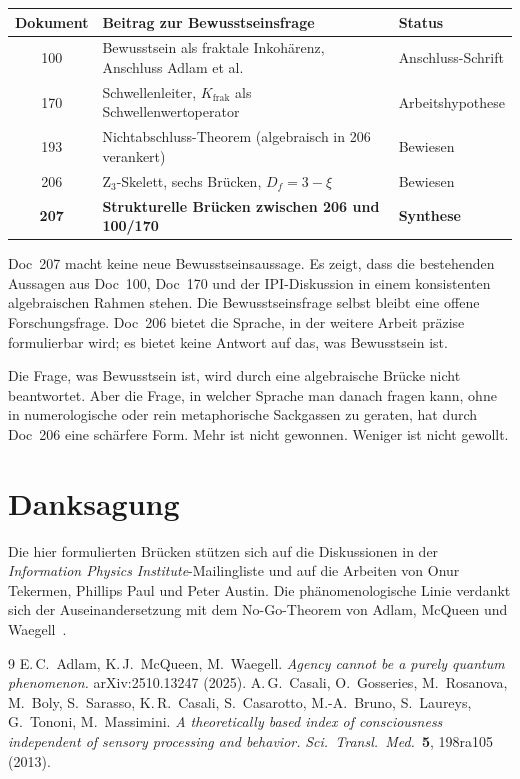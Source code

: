 \begin{center}
\begin{tabular}{c|p{8cm}|l}
\textbf{Dokument} & \textbf{Beitrag zur Bewusstseinsfrage} & \textbf{Status} \\
\hline
100 & Bewusstsein als fraktale Inkohärenz, Anschluss Adlam et al. & Anschluss-Schrift \\
170 & Schwellenleiter, $K_{\text{frak}}$ als Schwellenwertoperator & Arbeitshypothese \\
193 & Nichtabschluss-Theorem (algebraisch in 206 verankert) & Bewiesen \\
206 & Z$_3$-Skelett, sechs Brücken, $D_f = 3-\xi$ & Bewiesen \\
\textbf{207} & \textbf{Strukturelle Brücken zwischen 206 und 100/170} & \textbf{Synthese} \\
\end{tabular}
\end{center}

Doc~207 macht keine neue Bewusstseinsaussage. Es zeigt, dass die bestehenden Aussagen aus Doc~100, Doc~170 und der IPI-Diskussion in einem konsistenten algebraischen Rahmen stehen. Die Bewusstseinsfrage selbst bleibt eine offene Forschungsfrage. Doc~206 bietet die Sprache, in der weitere Arbeit präzise formulierbar wird; es bietet keine Antwort auf das, was Bewusstsein ist.

\begin{philosophical}[Schluss]
Die Frage, was Bewusstsein ist, wird durch eine algebraische Brücke nicht beantwortet. Aber die Frage, in welcher Sprache man danach fragen kann, ohne in numerologische oder rein metaphorische Sackgassen zu geraten, hat durch Doc~206 eine schärfere Form. Mehr ist nicht gewonnen. Weniger ist nicht gewollt.
\end{philosophical}

\section*{Danksagung}

Die hier formulierten Brücken stützen sich auf die Diskussionen in der \emph{Information Physics Institute}-Mailingliste und auf die Arbeiten von Onur Tekermen, Phillips Paul und Peter Austin. Die phänomenologische Linie verdankt sich der Auseinandersetzung mit dem No-Go-Theorem von Adlam, McQueen und Waegell~\cite{Adlam2025}.

\begin{thebibliography}{9}
 E.\,C.~Adlam, K.\,J.~McQueen, M.~Waegell. \emph{Agency cannot be a purely quantum phenomenon.} arXiv:2510.13247 (2025).
 A.\,G.~Casali, O.~Gosseries, M.~Rosanova, M.~Boly, S.~Sarasso, K.\,R.~Casali, S.~Casarotto, M.-A.~Bruno, S.~Laureys, G.~Tononi, M.~Massimini. \emph{A theoretically based index of consciousness independent of sensory processing and behavior.} \emph{Sci.\ Transl.\ Med.}\ \textbf{5}, 198ra105 (2013).
\end{thebibliography}

